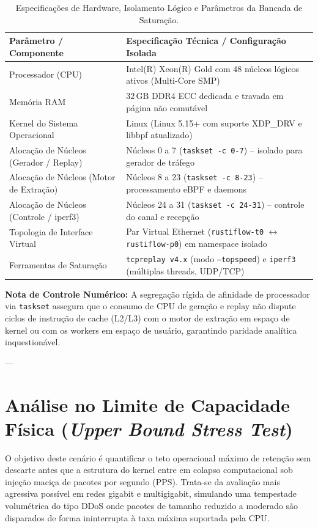 \documentclass[11pt,a4paper]{article}
\begin{document}
\begin{table}[H]
\centering
\begin{threeparttable}
\begin{tabular}{ll}
\toprule
\textbf{Parâmetro / Componente} & \textbf{Especificação Técnica / Configuração Isolada} \\
\midrule
Processador (CPU) & Intel(R) Xeon(R) Gold com 48 núcleos lógicos ativos (Multi-Core SMP) \\
Memória RAM & $32\,\text{GB}$ DDR4 ECC dedicada e travada em página não comutável \\
Kernel do Sistema Operacional & Linux (Linux 5.15+ com suporte XDP\_DRV e libbpf atualizado) \\
Alocação de Núcleos (Gerador / Replay) & Núcleos 0 a 7 (\texttt{taskset -c 0-7}) -- isolado para gerador de tráfego \\
Alocação de Núcleos (Motor de Extração) & Núcleos 8 a 23 (\texttt{taskset -c 8-23}) -- processamento eBPF e daemons \\
Alocação de Núcleos (Controle / iperf3) & Núcleos 24 a 31 (\texttt{taskset -c 24-31}) -- controle do canal e recepção \\
Topologia de Interface Virtual & Par Virtual Ethernet (\texttt{rustiflow-t0} $\longleftrightarrow$ \texttt{rustiflow-p0}) em namespace isolado \\
Ferramentas de Saturação & \texttt{tcpreplay v4.x} (modo \texttt{--topspeed}) e \texttt{iperf3} (múltiplas threads, UDP/TCP) \\
\bottomrule
\end{tabular}
\begin{tablenotes}
\small
\item[-] \textbf{Nota de Controle Numérico:} A segregação rígida de afinidade de processador via \texttt{taskset} assegura que o consumo de CPU de geração e replay não dispute ciclos de instrução de cache (L2/L3) com o motor de extração em espaço de kernel ou com os workers em espaço de usuário, garantindo paridade analítica inquestionável.
\end{tablenotes}
\end{threeparttable}
\caption{Especificações de Hardware, Isolamento Lógico e Parâmetros da Bancada de Saturação.}
\end{table}

---

\section{Análise no Limite de Capacidade Física (\textit{Upper Bound Stress Test})}
O objetivo deste cenário é quantificar o teto operacional máximo de retenção sem descarte antes que a estrutura do kernel entre em colapso computacional sob injeção maciça de pacotes por segundo (PPS). Trata-se da avaliação mais agressiva possível em redes gigabit e multigigabit, simulando uma tempestade volumétrica do tipo DDoS onde pacotes de tamanho reduzido a moderado são disparados de forma ininterrupta à taxa máxima suportada pela CPU.
\end{document}
